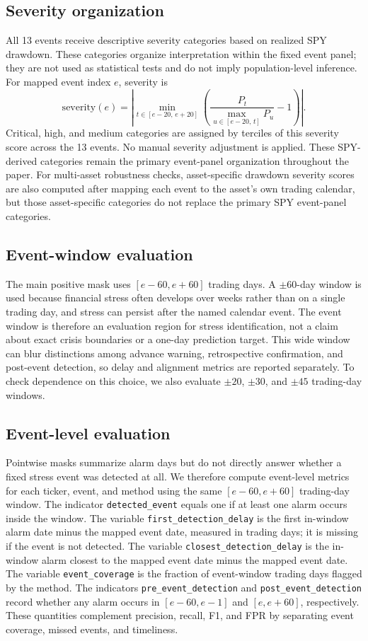 \documentclass[pdflatex,sn-mathphys-num]{sn-jnl}
\begin{document}
\subsection{Severity organization}
All 13 events receive descriptive severity categories based on realized SPY drawdown. These categories organize interpretation within the fixed event panel; they are not used as statistical tests and do not imply population-level inference. For mapped event index $e$, severity is
\begin{equation}
\mathrm{severity}(e)=\left|\min_{t\in[e-20,\,e+20]}\left(\frac{P_t}{\max_{u\in[e-20,\,t]}P_u}-1\right)\right|.
\end{equation}
Critical, high, and medium categories are assigned by terciles of this severity score across the 13 events. No manual severity adjustment is applied. These SPY-derived categories remain the primary event-panel organization throughout the paper. For multi-asset robustness checks, asset-specific drawdown severity scores are also computed after mapping each event to the asset's own trading calendar, but those asset-specific categories do not replace the primary SPY event-panel categories.

\subsection{Event-window evaluation}
The main positive mask uses $[e-60,e+60]$ trading days. A $\pm60$-day window is used because financial stress often develops over weeks rather than on a single trading day, and stress can persist after the named calendar event. The event window is therefore an evaluation region for stress identification, not a claim about exact crisis boundaries or a one-day prediction target. This wide window can blur distinctions among advance warning, retrospective confirmation, and post-event detection, so delay and alignment metrics are reported separately. To check dependence on this choice, we also evaluate $\pm20$, $\pm30$, and $\pm45$ trading-day windows.

\subsection{Event-level evaluation}
Pointwise masks summarize alarm days but do not directly answer whether a fixed stress event was detected at all. We therefore compute event-level metrics for each ticker, event, and method using the same $[e-60,e+60]$ trading-day window. The indicator \texttt{detected\_event} equals one if at least one alarm occurs inside the window. The variable \texttt{first\_detection\_delay} is the first in-window alarm date minus the mapped event date, measured in trading days; it is missing if the event is not detected. The variable \texttt{closest\_detection\_delay} is the in-window alarm closest to the mapped event date minus the mapped event date. The variable \texttt{event\_coverage} is the fraction of event-window trading days flagged by the method. The indicators \texttt{pre\_event\_detection} and \texttt{post\_event\_detection} record whether any alarm occurs in $[e-60,e-1]$ and $[e,e+60]$, respectively. These quantities complement precision, recall, F1, and FPR by separating event coverage, missed events, and timeliness.
\end{document}
